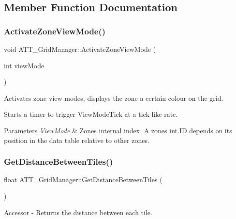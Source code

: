 \subsection{Member Function Documentation}
\mbox{\label{class_a_t_t___grid_manager_a209c380bfc8c559954b0898bef309038}} 
\subsubsection{\texorpdfstring{ActivateZoneViewMode()}{ActivateZoneViewMode()}}
{\footnotesize\ttfamily void A\+T\+T\+\_\+\+Grid\+Manager\+::\+Activate\+Zone\+View\+Mode (\begin{DoxyParamCaption}\item[{int}]{view\+Mode }\end{DoxyParamCaption})}



Activates zone view modes, displays the zone a certain colour on the grid. 

Starts a timer to trigger View\+Mode\+Tick at a tick like rate. 
\begin{DoxyParams}{Parameters}
{\em View\+Mode} & Zone\textquotesingle{}s internal index. A zone\textquotesingle{}s int.\+ID depends on its position in the data table relative to other zones. \\
\hline
\end{DoxyParams}
\mbox{\label{class_a_t_t___grid_manager_ac48caa79e0a7d2255484da80e5e563d3}} 
\subsubsection{\texorpdfstring{GetDistanceBetweenTiles()}{GetDistanceBetweenTiles()}}
{\footnotesize\ttfamily float A\+T\+T\+\_\+\+Grid\+Manager\+::\+Get\+Distance\+Between\+Tiles (\begin{DoxyParamCaption}{ }\end{DoxyParamCaption})}



Accessor -\/ Returns the distance between each tile. 

